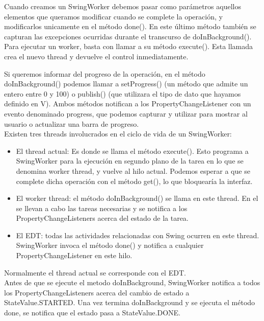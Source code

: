 \documentclass[12pt, a4paper]{book}
\begin{document}
 Cuando creamos un SwingWorker debemos pasar como parámetros aquellos elementos que queramos modificar cuando se complete la operación, y modificarlos unicamente en el método done(). En este último método también se capturan las excepciones ocurridas durante el transcurso de doInBackground().\\
 
 Para ejecutar un worker, basta con llamar a su método execute(). Esta llamada crea el nuevo thread y devuelve el control inmediatamente.
 
 \newpage
 
Si queremos informar del progreso de la operación, en el método doInBackground() podemos llamar a setProgress() (un método que admite un entero entre 0 y 100) o publish() (que utilizara el tipo de dato que hayamos definido en V). Ambos métodos notifican a los PropertyChangeListener con un evento denominado progress, que podemos capturar y utilizar para mostrar al usuario o actualizar una barra de progreso.\\


Existen tres threads involucrados en el ciclo de vida de un SwingWorker:

\begin{itemize}
	\item El thread actual: Es donde se llama el método execute(). Esto programa a SwingWorker para la ejecución en segundo plano de la tarea en lo que se denomina worker thread, y vuelve al hilo actual. Podemos esperar a que se complete dicha operación con el método get(), lo que bloquearía la interfaz.
	\item El worker thread: el método doInBackground() se llama en este thread. En el se llevan a cabo las tareas necesarias y se notifica a los PropertyChangeListeners acerca del estado de la tarea.
	\item El \gls{EDT}: todas las actividades relacionadas con Swing ocurren en este thread. SwingWorker invoca el método done() y notifica a cualquier PropertyChangeListener en este hilo.
\end{itemize}

Normalmente el thread actual se corresponde con el \gls{EDT}.\\

Antes de que se ejecute el metodo doInBackground, SwingWorker notifica a todos los PropertyChangeListeners acerca del cambio de estado a StateValue.STARTED. Una vez termina doInBackground y se ejecuta el método done, se notifica que el estado pasa a StateValue.DONE.\\
\end{document}
